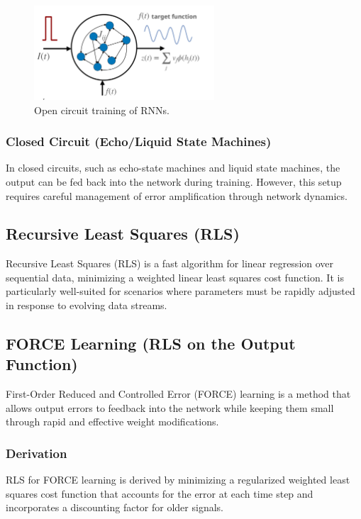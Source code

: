 \documentclass[11pt]{book} %
\begin{document}
\begin{figure}[ht]
\centering
\includegraphics[width=0.6\textwidth]{Figs/RNN_open_circuit.jpeg}
\caption{Open circuit training of RNNs.}
\label{fig:rnn_learning}
\end{figure}


\subsubsection{Closed Circuit (Echo/Liquid State Machines)}
In closed circuits, such as echo-state machines and liquid state machines, the output can be fed back into the network during training. However, this setup requires careful management of error amplification through network dynamics.

\subsection{Recursive Least Squares (RLS)}
Recursive Least Squares (RLS) is a fast algorithm for linear regression over sequential data, minimizing a weighted linear least squares cost function. It is particularly well-suited for scenarios where parameters must be rapidly adjusted in response to evolving data streams.

\subsection{FORCE Learning (RLS on the Output Function)}
First-Order Reduced and Controlled Error (FORCE) learning is a method that allows output errors to feedback into the network while keeping them small through rapid and effective weight modifications.

\subsubsection{Derivation}
RLS for FORCE learning is derived by minimizing a regularized weighted least squares cost function that accounts for the error at each time step and incorporates a discounting factor for older signals.
\end{document}
